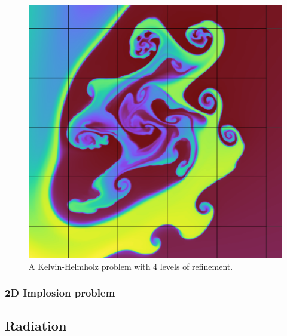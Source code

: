 \documentclass[fleqn,usenatbib]{mnras}
\begin{document}
\begin{figure}
    \includegraphics[width=0.9\columnwidth]{quokka_zoom2.pdf}
    \caption{A Kelvin-Helmholz problem with 4 levels of refinement.}
    \label{fig:kh_zoom}
\end{figure}
\subsubsection{2D Implosion problem}

\subsection{Radiation}
\end{document}
